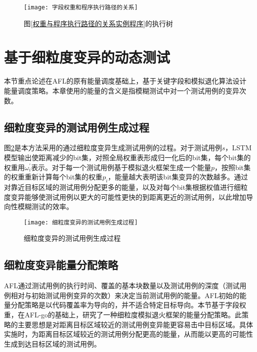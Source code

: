\begin{figure}[htb]
\begin{center}
\texttt{[image: 字段权重和程序执行路径的关系]}
\end{center}
\caption{图\ref{权重与程序执行路径的关系实例程序}的执行树}
\label{字段权重和程序执行路径的关系}
\end{figure}


\section{基于细粒度变异的动态测试}
\label{基于字段权重的模糊测试能量调度策略}

本节重点论述在AFL的原有能量调度基础上，基于关键字段和模拟退化算法设计能量调度策略。本章使用的能量的含义是指模糊测试中对一个测试用例的变异次数。

\subsection{细粒度变异的测试用例生成过程}

图\ref{细粒度变异的测试用例生成过程}是本方法采用的通过细粒度变异生成测试用例的过程。对于测试用例$s$，LSTM模型输出使距离减少的bit集，对照全局权重表形成归一化后的bit集，每个bit集的权重用$\omega^{'}_{i}$表示。对于每一个测试用例基于模拟退火框架生成一个能量$p$，按照bit集的权重重新计算每个bit集的权重$p_i$，能量越大表明该bit集变异的次数越多。通过对靠近目标区域的测试用例分配更多的能量，以及对每个bit集根据权值进行细粒度变异能够使测试用例以更大的可能性更快的到距离更近的测试用例，以此增加导向性模糊测试的效率。

\begin{figure}[htb]
\begin{center}
\texttt{[image: 细粒度变异的测试用例生成过程]}
\end{center}
\caption{细粒度变异的测试用例生成过程}
\label{细粒度变异的测试用例生成过程}
\end{figure}


\subsection{细粒度变异能量分配策略}

AFL通过测试用例的执行时间、覆盖的基本块数量以及测试用例的深度（测试用例相对与初始测试用例变异的次数）来决定当前测试用例的能量。AFL初始的能量分配策略是以代码覆盖率为导向的，并不适合特定目标导向。本节基于字段权重，在AFL-go的基础上，研究了一种细粒度模拟退火框架的能量分配策略。此策略的主要思想是对距离目标区域较近的测试用例变异能更容易击中目标区域。具体实施时，为距离目标区域较近的测试用例分配更高的能量，从而能以更高的可能性生成到达目标区域的测试用例。


